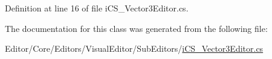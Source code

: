 Definition at line 16 of file i\+C\+S\+\_\+\+Vector3\+Editor.\+cs.



The documentation for this class was generated from the following file\+:\begin{DoxyCompactItemize}
\item 
Editor/\+Core/\+Editors/\+Visual\+Editor/\+Sub\+Editors/\hyperlink{i_c_s___vector3_editor_8cs}{i\+C\+S\+\_\+\+Vector3\+Editor.\+cs}\end{DoxyCompactItemize}
